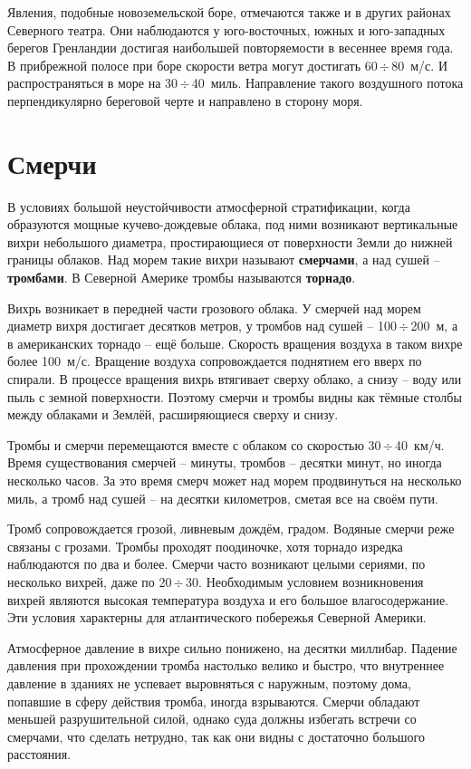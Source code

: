 \documentclass[a4paper, 12pt, twoside, final, book, russian, fittopage, cyremdash, openright]{ncc}
\newcommand{\mps}{~м/с\xspace}
\newcommand{\kph}{~км/ч\xspace}
\newcommand{\otdo}{\,\ensuremath{\div}\,}
\begin{document}
Явления, подобные новоземельской боре, отмечаются также и в других
районах Северного театра. Они наблюдаются у юго-восточных, южных и
юго-западных берегов Гренландии достигая наибольшей повторяемости в
весеннее время года. В прибрежной полосе при боре скорости ветра могут
достигать 60\otdo{}80\mps{}. И распространяться в море на
30\otdo{}40~миль. Направление такого воздушного потока перпендикулярно
береговой черте и направлено в сторону моря.

\section{Смерчи}
\label{sec:tornados}

В условиях большой неустойчивости атмосферной стратификации, когда
образуются мощные кучево-дождевые облака, под ними возникают
вертикальные вихри небольшого диаметра, простирающиеся от поверхности
Земли до нижней границы облаков. Над морем такие вихри называют
\textbf{смерчами}, а над сушей \---
\textbf{тромбами}. В Северной Америке тромбы называются
\textbf{торнадо}.

Вихрь возникает в передней части грозового облака. У смерчей над морем
диаметр вихря достигает десятков метров, у тромбов над сушей \---
100\otdo{}200~м, а в американских торнадо \--- ещё больше. Скорость
вращения воздуха в таком вихре более 100\mps{}. Вращение воздуха
сопровождается поднятием его вверх по спирали. В процессе вращения
вихрь втягивает сверху облако, а снизу \--- воду или пыль с земной
поверхности. Поэтому смерчи и тромбы видны как тёмные столбы между
облаками и Землёй, расширяющиеся сверху и снизу.

Тромбы и смерчи перемещаются вместе с облаком со скоростью
30\otdo{}40\kph{}. Время существования смерчей \--- минуты, тромбов \---
десятки минут, но иногда несколько часов. За это время смерч может над
морем продвинуться на несколько миль, а тромб над сушей \--- на десятки
километров, сметая все на своём пути.

Тромб сопровождается грозой, ливневым дождём, градом. Водяные смерчи
реже связаны с грозами. Тромбы проходят поодиночке, хотя торнадо
изредка наблюдаются по два и более. Смерчи часто возникают целыми
сериями, по несколько вихрей, даже по 20\otdo{}30. Необходимым условием
возникновения вихрей являются высокая температура воздуха и его
большое влагосодержание. Эти условия характерны для атлантического
побережья Северной Америки.

Атмосферное давление в вихре сильно понижено, на десятки
миллибар. Падение давления при прохождении тромба настолько велико и
быстро, что внутреннее давление в зданиях не успевает выровняться с
наружным, поэтому дома, попавшие в сферу действия тромба, иногда
взрываются. Смерчи обладают меньшей разрушительной силой, однако суда
должны избегать встречи со смерчами, что сделать нетрудно, так как они
видны с достаточно большого расстояния.
\end{document}
